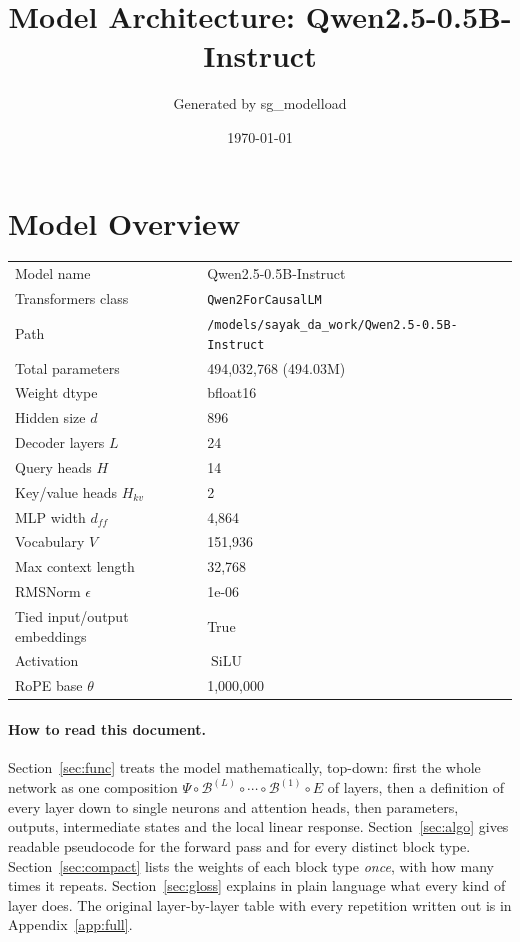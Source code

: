 \documentclass[10pt,a4paper]{article}
\title{Model Architecture: Qwen2.5-0.5B-Instruct}
\author{Generated by sg\_modelload}
\date{\today}
\newcommand{\op}[1]{\operatorname{#1}}
\theoremstyle{definition}
\begin{document}
\maketitle
\tableofcontents
\clearpage
\section{Model Overview}
\begin{tabular}{ll}
\toprule
Model name & Qwen2.5-0.5B-Instruct \\
Transformers class & \texttt{Qwen2ForCausalLM} \\
Path & \texttt{/models/sayak\_da\_work/Qwen2.\allowbreak{}5-0.\allowbreak{}5B-Instruct} \\
Total parameters & 494,032,768 (494.03M) \\
Weight dtype & bfloat16 \\
\midrule
Hidden size $d$ & 896 \\
Decoder layers $L$ & 24 \\
Query heads $H$ & 14 \\
Key/value heads $H_{kv}$ & 2 \\
MLP width $d_{ff}$ & 4,864 \\
Vocabulary $V$ & 151,936 \\
Max context length & 32,768 \\
RMSNorm $\epsilon$ & 1e-06 \\
Tied input/output embeddings & True \\
Activation & $\op{SiLU}$ \\
RoPE base $\theta$ & 1,000,000 \\
\bottomrule
\end{tabular}

\paragraph{How to read this document.} Section~\ref{sec:func} treats the model mathematically, top-down: first the whole network as one composition $\Psi\circ\mathcal{B}^{(L)}\circ\cdots\circ\mathcal{B}^{(1)}\circ E$ of layers, then a definition of every layer down to single neurons and attention heads, then parameters, outputs, intermediate states and the local linear response. Section~\ref{sec:algo} gives readable pseudocode for the forward pass and for every distinct block type. Section~\ref{sec:compact} lists the weights of each block type \emph{once}, with how many times it repeats. Section~\ref{sec:gloss} explains in plain language what every kind of layer does. The original layer-by-layer table with every repetition written out is in Appendix~\ref{app:full}.
\end{document}
